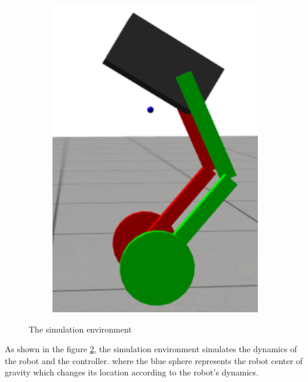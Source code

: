 \begin{figure}[h]
\begin{subfigure}[b]{0.3\textwidth}
        \includegraphics[width=\textwidth]{Simulation Environment_3}
        \label{fig:Simulation Environment_3}
    \end{subfigure}
    \caption{The simulation environment}
    \label{fig:The simulation environment}
\end{figure}

As shown in the figure \ref{fig:The simulation environment}, the simulation environment simulates the dynamics of the robot and the controller. where the blue sphere represents the robot center of gravity which changes its location according to the robot's dynamics.



